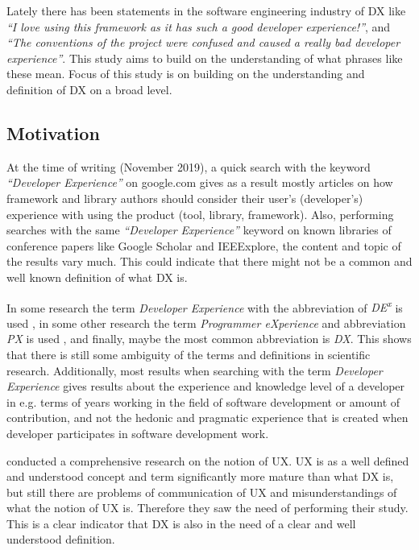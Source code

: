 \documentclass[english, 12pt, a4paper, sci, utf8, a-1b, online]{aaltothesis}
\newcommand{\now}{November 2019}
\begin{document}
Lately there has been statements in the software engineering industry of DX like \textit{``I love using this framework as it has such a good developer experience!''}, and \textit{``The conventions of the project were confused and caused a really bad developer experience''}. This study aims to build on the understanding of what phrases like these mean. Focus of this study is on building on the understanding  and definition of DX on a broad level.

\thispagestyle{empty}

\subsection{Motivation} \label{section:motivation}

At the time of writing (\now), a quick search with the keyword \textit{``Developer Experience''} on google.com gives as a result mostly articles on how framework and library authors should consider their user's (developer's) experience with using the product (tool, library, framework). Also, performing searches with the same \textit{``Developer Experience''} keyword on known libraries of conference papers like Google Scholar and IEEExplore, the content and topic of the results vary much. This could indicate that there might not be a common and well known definition of what DX is.

In some research the term \textit{Developer Experience} with the abbreviation of \textit{DE\textsuperscript{x}} is used \parencite{fagerholm-dx-concept-and-definition}, in some other research the term \textit{Programmer eXperience} and abbreviation \textit{PX} is used \parencite{programmer-experience}, and finally, maybe the most common abbreviation is \textit{DX}. This shows that there is still some ambiguity of the terms and definitions in scientific research. Additionally, most results when searching with the term \textit{Developer Experience} gives results about the experience and knowledge level of a developer in e.g. terms of years working in the field of software development or amount of contribution, and not the hedonic and pragmatic experience that is created when developer participates in software development work.

\textcite{understanding-ux} conducted a comprehensive research on the notion of UX. UX is as a well defined and understood concept and term significantly more mature than what DX is, but still there are problems of communication of UX and misunderstandings of what the notion of UX is. Therefore they saw the need of performing their study. This is a clear indicator that DX is also in the need of a clear and well understood definition.
\end{document}
